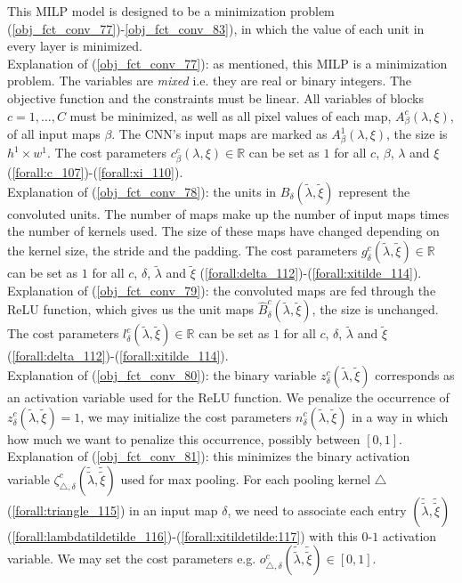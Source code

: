 \documentclass{article}
\begin{document}
This MILP model is designed to be a minimization problem (\ref{obj_fct_conv_77})-{\ref{obj_fct_conv_83}), in which the value of each unit in every layer is minimized.\\
Explanation of (\ref{obj_fct_conv_77}): as mentioned, this MILP is a minimization problem. The variables are \textit{mixed} i.e. they are real or binary integers. The objective function and the constraints must be linear. All variables of blocks $c=1, \ldots, C$ must be minimized, as well as all pixel values of each map, $A_\beta^c(\lambda,\xi)$, of all input maps $\beta$. The CNN's input maps are marked as $A_\beta^1(\lambda,\xi)$, the size is $h^1 \times w^1$. The cost parameters $c_\beta^c(\lambda,\xi) \in \mathbb{R}$ can be set as $1$ for all $c$, $\beta$, $\lambda$ and $\xi$ (\ref{forall:c_107})-(\ref{forall:xi_110}).\\
Explanation of (\ref{obj_fct_conv_78}): the units in $B_\delta(\tilde{\lambda}, \tilde{\xi})$ represent the convoluted units. The number of maps make up the number of input maps times the number of kernels used. The size of these maps have changed depending on the kernel size, the stride and the padding. The cost parameters $g_\delta^c(\tilde{\lambda},\tilde{\xi}) \in \mathbb{R}$ can be set as $1$ for all $c$, $\delta$, $\tilde{\lambda}$ and $\tilde{\xi}$ (\ref{forall:delta_112})-(\ref{forall:xitilde_114}).\\
Explanation of (\ref{obj_fct_conv_79}): the convoluted maps are fed through the ReLU function, which gives us the unit maps $\hat{B}_\delta^c(\tilde{\lambda}, \tilde{\xi})$, the size is unchanged. The cost parameters $l_\delta^c(\tilde{\lambda}, \tilde{\xi}) \in \mathbb{R}$ can be set as $1$ for all $c$, $\delta$, $\tilde{\lambda}$ and $\tilde{\xi}$ (\ref{forall:delta_112})-(\ref{forall:xitilde_114}).\\
Explanation of (\ref{obj_fct_conv_80}): the binary variable $z_\delta^c(\tilde{\lambda}, \tilde{\xi})$ corresponds as an activation variable used for the ReLU function. We penalize the occurrence of $z_\delta^c(\tilde{\lambda}, \tilde{\xi})=1$, we may initialize the cost parameters $n_\delta^c(\tilde{\lambda}, \tilde{\xi})$ in a way in which how much we want to penalize this occurrence, possibly between $[0,1]$.\\
Explanation of (\ref{obj_fct_conv_81}): this minimizes the binary activation variable $\zeta_{\triangle, \delta}^c(\tilde{\tilde{\lambda}},\tilde{\tilde{\xi}}) $ used for max pooling. For each pooling kernel $\triangle$ (\ref{forall:triangle_115}) in an input map $\delta$, we need to associate each entry $(\tilde{\tilde{\lambda}}, \tilde{\tilde{\xi}})$ (\ref{forall:lambdatildetilde_116})-(\ref{forall:xitildetilde:117}) with this $0$-$1$ activation variable. We may set the cost parameters e.g. $o_{\triangle, \delta}^c(\tilde{\tilde{\lambda}},\tilde{\tilde{\xi}}) \in [0,1]$.\\
}
\end{document}
